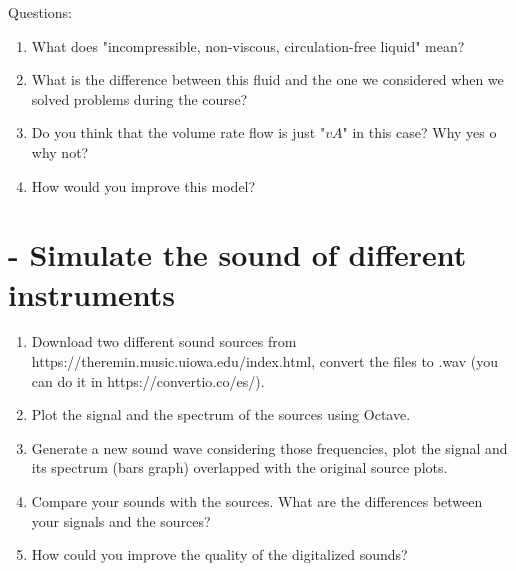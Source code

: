 \documentclass[12pt]{article}
\begin{document}
\vspace{15mm}
Questions:

\vspace{3mm}

\begin{enumerate}
    \item What does "incompressible, non-viscous, circulation-free liquid" mean? 
    \item What is the difference between this fluid and the one we considered when we solved problems during the course?
    \item Do you think that the volume rate flow is just "$vA$" in this case? Why yes o why not?
    \item How would you improve this model?
\end{enumerate}


\section*{ \theexample-  Simulate the sound of different instruments}



    \begin{enumerate}
    \item  Download two different sound sources from  https://theremin.music.uiowa.edu/index.html, convert the files to .wav (you can do it in https://convertio.co/es/).
    \vspace{3mm}
    \item Plot the signal and the spectrum of the sources using Octave.
    \vspace{3mm}
     
    \item Generate a new sound wave considering those frequencies, plot the signal and its spectrum (bars graph) overlapped with the original source plots.
    \vspace{3mm}

    
    \item Compare your sounds with the sources. What are the differences between your signals and the sources?
    
    \vspace{3mm}
    
    \item How could you improve the quality of the digitalized sounds?

    \end{enumerate}
    
\end{document}
